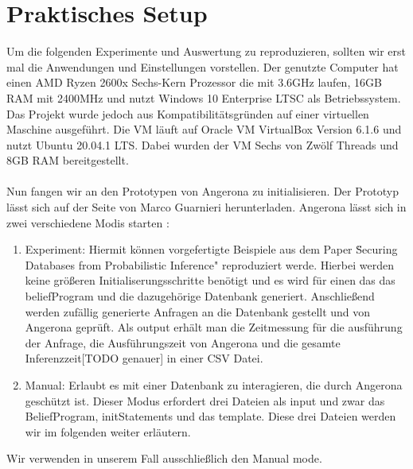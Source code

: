 \documentclass[german,version-2020-11]{uzl-thesis}
\begin{document}
\section{Praktisches Setup}
Um die folgenden Experimente und Auswertung zu reproduzieren, sollten wir erst mal die Anwendungen und Einstellungen vorstellen. Der genutzte Computer hat einen AMD Ryzen 2600x Sechs-Kern Prozessor die mit 3.6GHz laufen, 16GB RAM mit 2400MHz und nutzt Windows
10 Enterprise LTSC als Betriebssystem. Das Projekt wurde jedoch aus Kompatibilitätsgründen auf einer virtuellen Maschine ausgeführt. Die VM läuft auf Oracle VM VirtualBox Version 6.1.6 und nutzt Ubuntu 20.04.1 LTS. Dabei wurden der VM Sechs von Zwölf Threads und 8GB RAM bereitgestellt. \\ \\
Nun fangen wir an den Prototypen von Angerona zu initialisieren.
Der Prototyp lässt sich auf der Seite von Marco Guarnieri \cite{6} herunterladen. Angerona lässt sich in zwei verschiedene Modis starten :
\begin{enumerate}
	\item Experiment: Hiermit können vorgefertigte Beispiele aus dem Paper \"Securing Databases from Probabilistic Inference" \cite{6} reproduziert werde. Hierbei werden keine größeren Initialiserungsschritte benötigt und es wird für einen das das beliefProgram und die dazugehörige Datenbank generiert. Anschließend werden zufällig generierte Anfragen an die Datenbank gestellt und von Angerona geprüft. Als output erhält man die Zeitmessung für die ausführung der Anfrage, die Ausführungszeit von Angerona und die gesamte Inferenzzeit[TODO genauer]	in einer CSV Datei.
	\item Manual: Erlaubt es mit einer Datenbank zu interagieren, die durch Angerona geschützt ist. Dieser Modus erfordert drei Dateien als input und zwar das BeliefProgram, initStatements und das template. Diese drei Dateien werden wir im folgenden weiter erläutern.
\end{enumerate}
Wir verwenden in unserem Fall ausschließlich den Manual mode.
\end{document}
